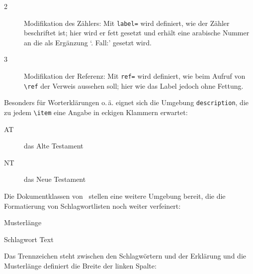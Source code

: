 \begin{description}
 \item[2] Modifikation des Zählers: 
 Mit \lstinline/label=/ wird definiert,
 wie der Zähler beschriftet ist; hier wird er fett gesetzt und 
 erhält eine arabische Nummer an die als Ergänzung \enquote*{. Fall:} gesetzt wird.
  \item[3] Modifikation der Referenz: 
   Mit \lstinline/ref=/ wird definiert,
   wie beim Aufruf von \lstinline/\ref/ der Verweis aussehen soll;
   hier wie das Label jedoch ohne Fettung. 
 \end{description}
 \iffalse
 \begin{enumerate}[%
  label={\bfseries \arabic{*}. Fall:\ },
  ref={\arabic{*}. Fall}]
\item Nominativ \label{fall:1}
\item Genitiv\label{fall:2}
\item Dativ\label{fall:3}
\item Akkusativ\label{fall:4}
\end{enumerate}
Der \ref{fall:1} wird auch Werfall gennant,
der \ref{fall:4} hingegen Wenfall.
 \fi
 

Besonders für Worterklärungen o.\,ä. eignet sich die Umgebung \lstinline/description/,
die zu jedem \lstinline/\item/  eine Angabe in eckigen Klammern erwartet:

\begin{lfgwexample}{}
\begin{description}
 \item[AT] das Alte Testament
 \item[NT] das Neue Testament 
\end{description} 
\end{lfgwexample}


Die Dokumentklassen von \KOMAScript\ stellen eine weitere Umgebung bereit, die die 
Formatierung von Schlagwortlisten noch weiter verfeinert:

\begin{lfgwcode}{}
 \begin{labeling}[Trennzeichen]{Musterlänge}
  \item[Schlagwort] Text
 \end{labeling}
\end{lfgwcode}

Das Trennzeichen steht zwischen den Schlagwörtern und der Erklärung und die Musterlänge definiert
die Breite der linken Spalte:

